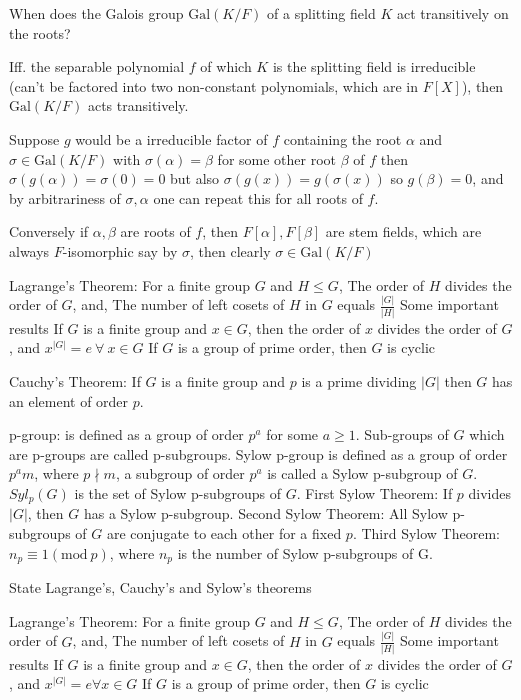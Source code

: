 When does the Galois group \(\text{Gal}(K/F)\) of a splitting field \(K\) act transitively on the roots?

Iff. the separable polynomial \(f\) of which \(K\) is the splitting field is irreducible (can't be factored
into two non-constant polynomials, which are in \(F[X]\)), then \(\text{Gal}(K/F)\) acts transitively.

Suppose \(g\) would be a irreducible factor of \(f\) containing the root \(\alpha\) and \(\sigma \in \text{Gal}(K/F)\) with \(\sigma(\alpha) = \beta\)
for some other root \(\beta\) of \(f\) then \(\sigma(g(\alpha)) = \sigma(0) = 0\) but also \(\sigma(g(x)) = g(\sigma(x))\) so \(g(\beta) = 0\), and by arbitrariness
of \(\sigma, \alpha\) one can repeat this for all roots of \(f\).

Conversely if \(\alpha, \beta\) are roots of \(f\), then \(F[\alpha], F[\beta]\) are stem fields, which are always \(F\)-isomorphic say by \(\sigma\),
then clearly \(\sigma \in \text{Gal}(K/F)\)



Lagrange's Theorem: For a finite group $G$ and $H \leq G$,
The order of $H$ divides the order of $G$, and,
The number of left cosets of $H$ in $G$ equals $\frac{|G|}{|H|}$
Some important results
If $G$ is a finite group and $x \in G$, then the order of $x$ divides the order of $G$, and $x^{|G|}=e\ \forall\ x \in G$
If $G$ is a group of prime order, then $G$ is cyclic


Cauchy's Theorem: If $G$ is a finite group and $p$ is a prime dividing $|G|$ then $G$ has an element of order $p$.

p-group: is defined as a group of order $p^a$ for some $a \geq 1$. Sub-groups of $G$ which are p-groups are called p-subgroups.
Sylow p-group is defined as a group of order $p^am$, where $p \nmid m$, a subgroup of order $p^a$ is called a Sylow p-subgroup of $G$. $Syl_p(G)$ is the set of Sylow p-subgroups of $G$.
First Sylow Theorem:
If $p$ divides $|G|$, then $G$ has a Sylow p-subgroup.
Second Sylow Theorem:
All Sylow p-subgroups of $G$ are conjugate to each other for a fixed $p$.
Third Sylow Theorem:
$n_p \equiv 1 (\text{mod}\ p)$, where $n_p$ is the number of Sylow p-subgroups of G.

State Lagrange's, Cauchy's and Sylow's theorems

Lagrange's Theorem: For a finite group \(G\) and \(H \leq G\),
The order of \(H\) divides the order of \(G\), and,
The number of left cosets of \(H\) in \(G\) equals \(\frac{|G|}{|H|}\)
Some important results
If \(G\) is a finite group and \(x \in G\), then the order of \(x\) divides the order of \(G\), and \(x^{|G|}=e \forall x \in G\)
If \(G\) is a group of prime order, then \(G\) is cyclic

